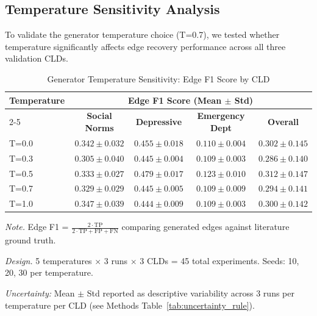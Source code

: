 \documentclass{article}
\begin{document}
\subsection{Temperature Sensitivity Analysis}

To validate the generator temperature choice (T=0.7), we tested whether temperature significantly affects edge recovery performance across all three validation CLDs.

\begin{table}[H]
\centering
\caption{Generator Temperature Sensitivity: Edge F1 Score by CLD}
\label{tab:temperature_sensitivity}
\begin{threeparttable}
\begin{tabular}{lcccc}
\toprule
\textbf{Temperature} & \multicolumn{4}{c}{\textbf{Edge F1 Score (Mean $\pm$ Std)}} \\
\cmidrule(lr){2-5}
 & \textbf{Social Norms} & \textbf{Depressive} & \textbf{Emergency Dept} & \textbf{Overall} \\
\midrule
T=0.0 & $0.342 \pm 0.032$ & $0.455 \pm 0.018$ & $0.110 \pm 0.004$ & $0.302 \pm 0.145$ \\
T=0.3 & $0.305 \pm 0.040$ & $0.445 \pm 0.004$ & $0.109 \pm 0.003$ & $0.286 \pm 0.140$ \\
T=0.5 & $0.333 \pm 0.027$ & $0.479 \pm 0.017$ & $0.123 \pm 0.010$ & $0.312 \pm 0.147$ \\
T=0.7 & $0.329 \pm 0.029$ & $0.445 \pm 0.005$ & $0.109 \pm 0.009$ & $0.294 \pm 0.141$ \\
T=1.0 & $0.347 \pm 0.039$ & $0.444 \pm 0.009$ & $0.109 \pm 0.003$ & $0.300 \pm 0.142$ \\
\bottomrule
\end{tabular}
\begin{tablenotes}
\small
\item \textit{Note.} Edge F1 = $\frac{2 \cdot \text{TP}}{2 \cdot \text{TP} + \text{FP} + \text{FN}}$ comparing generated edges against literature ground truth.
\item \textit{Design.} 5 temperatures $\times$ 3 runs $\times$ 3 CLDs = 45 total experiments. Seeds: 10, 20, 30 per temperature.
\item \textit{Uncertainty:} Mean $\pm$ Std reported as descriptive variability across 3 runs per temperature per CLD (see Methods Table~\ref{tab:uncertainty_rule}).

\end{tablenotes}
\end{threeparttable}
\end{table}
\end{document}
